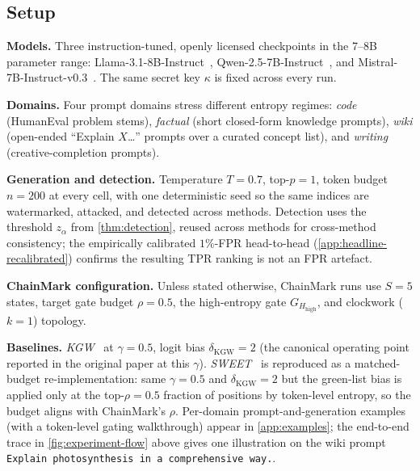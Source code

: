 \subsection{Setup}
\label{subsec:exp-setup}

\textbf{Models.} Three instruction-tuned, openly licensed
checkpoints in the 7--8B parameter range:
Llama-3.1-8B-Instruct~\citep{grattafiori2024llama3},
Qwen-2.5-7B-Instruct~\citep{yang2024qwen25}, and
Mistral-7B-Instruct-v0.3~\citep{jiang2023mistral}. The same secret
key $\kappa$ is fixed across every run.

\textbf{Domains.} Four prompt domains stress different entropy regimes:
\emph{code} (HumanEval problem stems), \emph{factual} (short closed-form
knowledge prompts), \emph{wiki} (open-ended ``Explain $X$\ldots''
prompts over a curated concept list), and \emph{writing}
(creative-completion prompts).

\textbf{Generation and detection.} Temperature $T = 0.7$, top-$p = 1$,
token budget $n = 200$ at every cell, with one deterministic seed so
the same indices are watermarked, attacked, and detected across
methods. Detection uses the threshold $z_\alpha$ from
\autoref{thm:detection}, reused across methods for cross-method
consistency; the empirically calibrated $1\%$-FPR head-to-head
(\autoref{app:headline-recalibrated}) confirms the resulting TPR
ranking is not an FPR artefact.

\textbf{ChainMark configuration.} Unless stated otherwise, ChainMark runs use
$S = 5$ states, target gate budget $\rho = 0.5$, the high-entropy gate
$G_{H_{\mathrm{high}}}$, and clockwork ($k{=}1$) topology.

\textbf{Baselines.} \emph{KGW}~\citep{kirchenbauer2023watermark} at
$\gamma = 0.5$, logit bias $\delta_{\mathrm{KGW}} = 2$ (the canonical
operating point reported in the original paper at this $\gamma$).
\emph{SWEET}~\citep{lee2023sweet} is reproduced as a matched-budget
re-implementation: same $\gamma = 0.5$ and $\delta_{\mathrm{KGW}} = 2$
but the green-list bias is applied only at the top-$\rho{=}0.5$
fraction of positions by token-level entropy, so the budget aligns
with ChainMark's $\rho$. Per-domain prompt-and-generation examples (with a token-level
gating walkthrough) appear in \autoref{app:examples}; the
end-to-end trace in \autoref{fig:experiment-flow} above gives one
illustration on the wiki prompt
\texttt{Explain photosynthesis in a comprehensive way.}.

